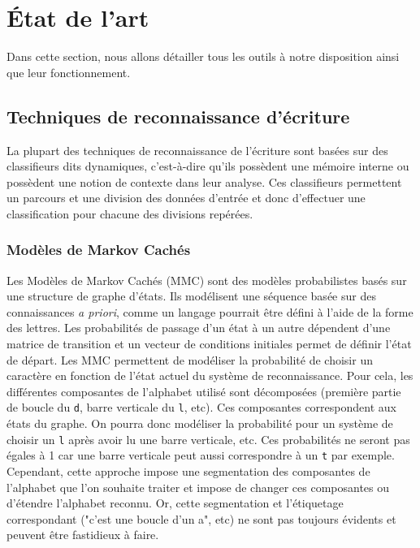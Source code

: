 \chapter{État de l'art}

Dans cette section, nous allons détailler tous les outils à notre disposition ainsi que leur fonctionnement.

\section{Techniques de reconnaissance d'écriture}

La plupart des techniques de reconnaissance de l'écriture sont basées sur des classifieurs
dits dynamiques, c'est-à-dire qu'ils possèdent une mémoire interne ou possèdent une notion
de contexte dans leur analyse. Ces classifieurs permettent un parcours et une division des
données d'entrée et donc d'effectuer une classification pour chacune des divisions repérées. 
		
\subsection{Modèles de Markov Cachés}

Les Modèles de Markov Cachés (MMC) sont des modèles probabilistes basés sur une structure de
graphe d'états. Ils modélisent une séquence basée sur des connaissances \textit{a priori},
comme un langage pourrait être défini à l'aide de la forme des lettres. Les probabilités de passage
d'un état à un autre dépendent d'une matrice de transition et un vecteur de conditions initiales
permet de définir l'état de départ. Les MMC permettent de modéliser la probabilité de choisir un caractère
en fonction de l'état actuel du système de reconnaissance. Pour cela, les différentes composantes
de l'alphabet utilisé sont décomposées (première partie de boucle du \texttt{d}, barre verticale du \texttt{l}, etc).
Ces composantes correspondent aux états du graphe. On pourra donc modéliser la
probabilité pour un système de choisir un \texttt{l} après avoir lu une barre verticale, etc.
Ces probabilités ne seront pas égales à 1 car une barre verticale peut aussi correspondre à un
\texttt{t} par exemple. Cependant, cette approche impose une segmentation des composantes
de l'alphabet que l'on souhaite traiter et impose de changer ces composantes ou d'étendre
l'alphabet reconnu. Or, cette segmentation et l'étiquetage correspondant ("c'est une boucle d'un a", etc)
ne sont pas toujours évidents et peuvent être fastidieux à faire.

